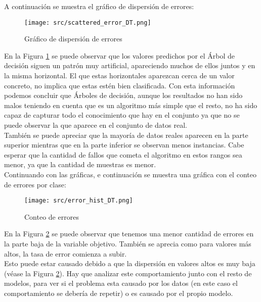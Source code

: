 \pagebreak
A continuación se muestra el gráfico de dispersión de errores:
\begin{figure}[H]
	\centering
	\texttt{[image: src/scattered\_error\_DT.png]}
	\caption{Gráfico de dispersión de errores}
	\label{fig:tree_scattered}
\end{figure}
En la Figura \ref{fig:tree_scattered} se puede observar que los valores predichos por el Árbol de decisión siguen un patrón muy artificial, apareciendo muchos de ellos juntos y en la misma horizontal. El que estas horizontales aparezcan cerca de un valor concreto, no implica que estas estén bien clasificada.
Con esta información podemos concluir que Árboles de decisión, aunque los resultados no han sido malos teniendo en cuenta que es un algoritmo más simple que el resto, no ha sido capaz de capturar todo el conocimiento que hay en el conjunto ya que no se puede observar la  que aparece en el conjunto de datos real.\\
También se puede apreciar que la mayoría de datos reales aparecen en la parte superior mientras que en la parte inferior se observan menos instancias. Cabe esperar que la cantidad de fallos que cometa el algoritmo en estos rangos sea menor, ya que la cantidad de muestras es menor.\\
\linebreak
Continuando con las gráficas, e continuación se muestra una gráfica con el conteo de errores por clase:
\begin{figure}[H]
	\centering
	\texttt{[image: src/error\_hist\_DT.png]}
	\caption{Conteo de errores}
	\label{fig:tree_error_plot}
\end{figure}
En la Figura \ref{fig:tree_error_plot} se puede observar que tenemos una menor cantidad de errores en la parte baja de la variable objetivo. También se aprecia como para valores más altos, la tasa de error comienza a subir. \\Esto puede estar causado debido a que la dispersión en valores altos es muy baja (véase la Figura \ref{fig:tree_error_plot}).
Hay que analizar este comportamiento junto con el resto de modelos, para ver si el problema esta causado por los datos (en este caso el comportamiento se debería de repetir) o es causado por el propio modelo.
